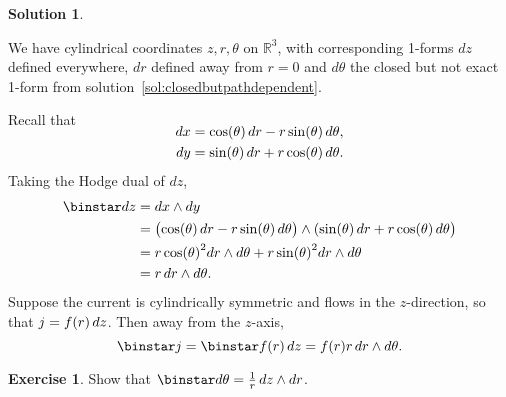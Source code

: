 \documentclass[11pt, a4paper]{report}
\theoremstyle{definition}
\newtheorem{exercise}{Exercise}[part]
\newtheorem{solution}{Solution}[part]
\newenvironment{ex}{\begin{exercise}}{\end{exercise}\pagebreak[1]}
\newenvironment{sol}{\begin{solution}}{\end{solution}\pagebreak[3]}
\renewcommand*{\d}{\ensuremath\mathop{}\mathopen{}d}
\renewcommand*{\star}{\ensuremath\mathop{}\mathopen\binstar\mathord{}}
\begin{document}
\begin{sol}\label{sol:cylindricaldualcurrent}

We have cylindrical coordinates $z, r, \theta$ on $\mathbb{R}^3$, with corresponding 1-forms $dz$ defined everywhere, $dr$ defined away from $r = 0$ and $d\theta$ the closed but not exact 1-form from solution~\ref{sol:closedbutpathdependent}.

Recall that
\begin{align*}
    \SwapAboveDisplaySkip
    dx &= \cos(\theta) \d r - r \sin(\theta) \d \theta, \\
    dy &= \sin(\theta) \d r + r \cos(\theta) \d \theta.
\end{align*}
Taking the Hodge dual of $dz$,
\begin{align*}
    \star dz &= dx \wedge dy \\
             &= \bigl( \cos(\theta) \d r -r \sin(\theta) \d \theta \bigr)
                       \wedge (\sin(\theta) \d r + r \cos(\theta) \d \theta \bigr) \\
             &= r \, {\cos(\theta)}^2 dr \wedge d\theta + r \, {\sin(\theta)}^2 dr \wedge d\theta \\
             &= r \d r \wedge d\theta.
\end{align*}
Suppose the current is cylindrically symmetric and flows in the $z$-direction, so that $j = f(r) \d z$. Then away from the $z$-axis,
\[
    \star j = \star f(r) \d z = f(r) r \d r \wedge d\theta.
\]

\end{sol}

\begin{ex}

Show that $\star d\theta = \frac{1}{r} \d z \wedge dr$.

\end{ex}
\end{document}
